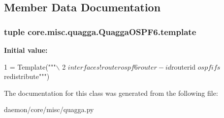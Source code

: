 \subsection{Member Data Documentation}
\hypertarget{classcore_1_1misc_1_1quagga_1_1_quagga_o_s_p_f6_ab9d9f747e2da46818a81239b03319972}{
\subsubsection[{template}]{\setlength{\rightskip}{0pt plus 5cm}tuple core.\+misc.\+quagga.\+Quagga\+O\+S\+P\+F6.\+template\hspace{0.3cm}{\ttfamily [static]}}}\label{classcore_1_1misc_1_1quagga_1_1_quagga_o_s_p_f6_ab9d9f747e2da46818a81239b03319972}
{\bfseries Initial value\+:}
\begin{DoxyCode}
1 = Template(\textcolor{stringliteral}{"""\(\backslash\)}
2 \textcolor{stringliteral}{$interfaces!router ospf6  router-id $routerid  $ospfifs  $redistribute"""})
\end{DoxyCode}


The documentation for this class was generated from the following file\+:\begin{DoxyCompactItemize}
\item 
daemon/core/misc/quagga.\+py\end{DoxyCompactItemize}
